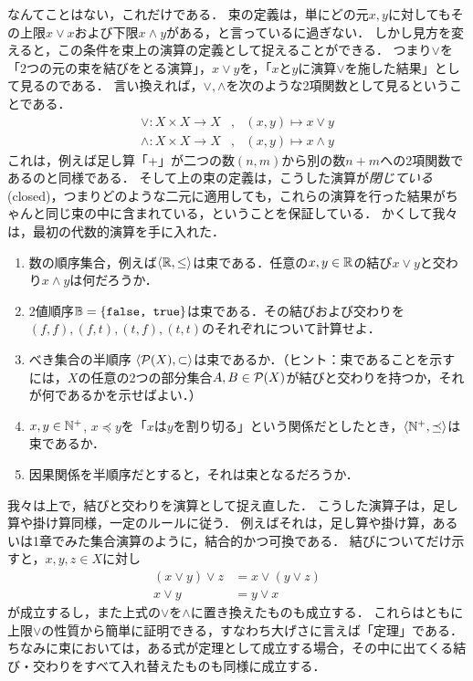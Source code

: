 \documentclass[11pt,a4paper]{jsarticle}
\begin{document}
なんてことはない，これだけである．
束の定義は，単にどの元$x, y$に対してもその上限$x \vee x$および下限$x \wedge y$がある，と言っているに過ぎない．
しかし見方を変えると，この条件を束上の演算の定義として捉えることができる．
つまり$\vee$を「2つの元の束を結びをとる演算」，$x \vee y$を，「$x$と$y$に演算$\vee$を施した結果」として見るのである．
言い換えれば，$\vee, \wedge$を次のような2項関数として見るということである．
\begin{align*}
 \vee: X \times X \to X &, \ \ \ (x, y) \mapsto x \vee y \\
 \wedge: X \times X \to X &, \ \ \ (x, y) \mapsto x \wedge y 
\end{align*}
これは，例えば足し算「+」が二つの数$(n, m)$から別の数$n + m$への2項関数であるのと同様である．
そして上の束の定義は，こうした演算が\emph{閉じている}(closed)，つまりどのような二元に適用しても，これらの演算を行った結果がちゃんと同じ束の中に含まれている，ということを保証している．
かくして我々は，最初の代数的演算を手に入れた．

\begin{exercise}
\begin{enumerate}
 \item 数の順序集合，例えば$\langle \mathbb{R}, \leq \rangle$は束である．任意の$x, y \in \mathbb{R}$の結び$x \vee y$と交わり$x \wedge y$は何だろうか．
 \item 2値順序$\mathbb{B} = \{ \texttt{false, true} \}$は束である．その結びおよび交わりを$(f, f), (f, t), (t, f), (t, t)$のそれぞれについて計算せよ．
 \item べき集合の半順序 $\langle \mathcal{P}(X), \subset \rangle$は束であるか．（ヒント：束であることを示すには，$X$の任意の2つの部分集合$A, B \in \mathcal{P}(X)$が結びと交わりを持つか，それが何であるかを示せばよい．）
 \item $x, y \in \mathbb{N}^+$, $x \preceq y$を「$x$は$y$を割り切る」という関係だとしたとき，$\langle \mathbb{N}^+, \preceq \rangle$は束であるか．
 \item 因果関係を半順序だとすると，それは束となるだろうか．
\end{enumerate}
 \end{exercise}

我々は上で，結びと交わりを演算として捉え直した．
こうした演算子は，足し算や掛け算同様，一定のルールに従う．
例えばそれは，足し算や掛け算，あるいは1章でみた集合演算のように，結合的かつ可換である．
結びについてだけ示すと，$x, y, z \in X$に対し
\begin{align}
(x \vee y) \vee z &= x \vee (y \vee z) \\
x \vee y &= y \vee x
\end{align}
が成立するし，また上式の$\vee$を$\wedge$に置き換えたものも成立する．
これらはともに上限$\vee$の性質から簡単に証明できる，すなわち大げさに言えば「定理」である．
ちなみに束においては，ある式が定理として成立する場合，その中に出てくる結び・交わりをすべて入れ替えたものも同様に成立する．
\end{document}
